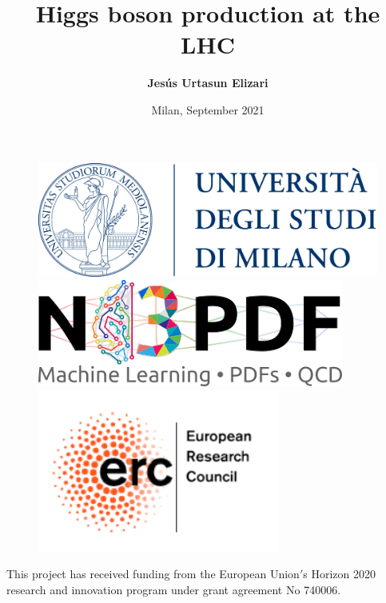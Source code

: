 \documentclass[aspectratio=43]{beamer}
\title[Higgs boson production at the LHC]{Higgs boson production at the LHC}
\author{\textbf {Jes\'us Urtasun Elizari}}
\date{Milan, September 2021}
\begin{document}
\begin{frame}

	\vspace{1.0 cm}
	
	
	\vspace{0.25 cm}

	\begin{figure}
		\includegraphics[width = 3.0 cm]{plots/unimi.png}
		\hfill
		\includegraphics[width = 3.0 cm]{plots/n3pdf.png}
		\hfill
		\includegraphics[width = 3.0 cm]{plots/erc.png}
		\endminipage
	\end{figure}

	\vspace{1.0 cm}
	
	{\scriptsize \color{blue} This project has received funding from the European Union$'$s Horizon 2020 research and innovation program under grant agreement No 740006.}

\end{frame}
\end{document}

